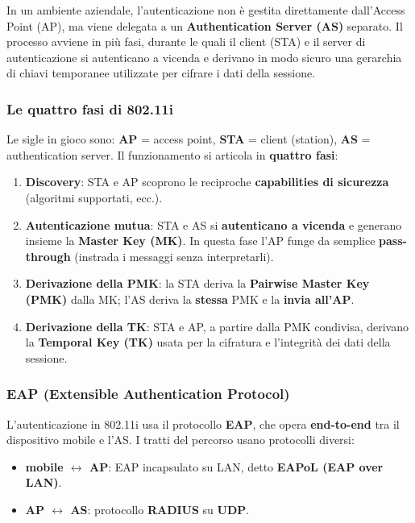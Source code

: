 In un ambiente aziendale, l'autenticazione non è gestita direttamente dall'Access Point (AP), ma viene delegata a un \textbf{Authentication Server (AS)} separato. Il processo avviene in più fasi, durante le quali il client (STA) e il server di autenticazione si autenticano a vicenda e derivano in modo sicuro una gerarchia di chiavi temporanee utilizzate per cifrare i dati della sessione.

\subsubsection{Le quattro fasi di 802.11i}
Le sigle in gioco sono: \textbf{AP} = access point, \textbf{STA} = client (station), \textbf{AS} = authentication server. Il funzionamento si articola in \textbf{quattro fasi}:
\begin{enumerate}
    \item \textbf{Discovery}: STA e AP scoprono le reciproche \textbf{capabilities di sicurezza} (algoritmi supportati, ecc.).
    \item \textbf{Autenticazione mutua}: STA e AS si \textbf{autenticano a vicenda} e generano insieme la \textbf{Master Key (MK)}. In questa fase l'AP funge da semplice \textbf{pass-through} (instrada i messaggi senza interpretarli).
    \item \textbf{Derivazione della PMK}: la STA deriva la \textbf{Pairwise Master Key (PMK)} dalla MK; l'AS deriva la \textbf{stessa} PMK e la \textbf{invia all'AP}.
    \item \textbf{Derivazione della TK}: STA e AP, a partire dalla PMK condivisa, derivano la \textbf{Temporal Key (TK)} usata per la cifratura e l'integrità dei dati della sessione.
\end{enumerate}

\subsubsection{EAP (Extensible Authentication Protocol)}
L'autenticazione in 802.11i usa il protocollo \textbf{EAP}, che opera \textbf{end-to-end} tra il dispositivo mobile e l'AS. I tratti del percorso usano protocolli diversi:
\begin{itemize}
    \item \textbf{mobile $\leftrightarrow$ AP}: EAP incapsulato su LAN, detto \textbf{EAPoL (EAP over LAN)}.
    \item \textbf{AP $\leftrightarrow$ AS}: protocollo \textbf{RADIUS} su \textbf{UDP}.
\end{itemize}

